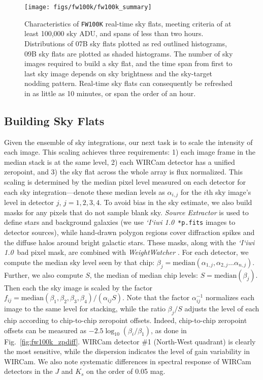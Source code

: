 \documentclass[iop]{emulateapj}
\newcommand{\sw}[1]{\textit{#1}} %
\newcommand{\iiwione}{\sw{`I`iwi 1.0}}
\newcommand{\Fig}[1]{Fig.~\ref{fig:#1}}  %
\begin{document}
\begin{figure}[t]
\centering
\texttt{[image: figs/fw100k/fw100k\_summary]}
\caption{Characteristics of \texttt{FW100K} real-time sky flats, meeting criteria of at least 100,000 sky ADU, and spans of less than two hours.
Distributions of 07B sky flats plotted as red outlined histograms, 09B sky flats are plotted as shaded histograms.
The number of sky images required to build a sky flat, and the time span from first to last sky image depends on sky brightness and the sky-target nodding pattern.
Real-time sky flats can consequently be refreshed in as little as 10 minutes, or span the order of an hour.}
\label{fig:fw100k_summary}
\end{figure}

\subsection{Building Sky Flats}
\label{sec:flatbuilding}

Given the ensemble of sky integrations, our next task is to scale the intensity of each image.
This scaling achieves three requirements: 1) each image frame in the median stack is at the same level, 2) each WIRCam detector has a unified zeropoint, and 3) the sky flat across the whole array is flux normalized.
This scaling is determined by the median pixel level measured on each detector for each sky integration---denote these median levels as $\alpha_{i,j}$ for the $i$th sky image's level in detector $j$, $j=1, 2, 3, 4$.
To avoid bias in the sky estimate, we also build masks for any pixels that do not sample blank sky.
\sw{Source Extractor} \citep{Bertin:1996} is used to define stars and background galaxies (we use \iiwione\ \texttt{*p.fits} images to detector sources), while hand-drawn polygon regions cover diffraction spikes and the diffuse halos around bright galactic stars. These masks, along with the \iiwione\ bad pixel mask, are combined with \sw{WeightWatcher} \citep{Marmo:2008}.
For each detector, we compute the median sky level seen by that chip: $\beta_j = \mathrm{median}(\alpha_{1,j}, \alpha_{2,j}\ldots \alpha_{n,j} )$.
Further, we also compute $S$, the median of median chip levels: $S=\mathrm{median}(\beta_j)$.
Then each the sky image is scaled by the factor $f_{ij} = \mathrm{median}(\beta_1, \beta_2, \beta_3, \beta_4) / (\alpha_{ij} S)$.
Note that the factor $\alpha_{ij}^{-1}$ normalizes each image to the same level for stacking, while the ratio $\beta_j / S$ adjusts the level of each chip according to chip-to-chip zeropoint offsets.
Indeed, chip-to-chip zeropoint offsets can be measured as $-2.5 \log_{10}(\beta_i / \beta_1)$, as done in \Fig{fw100k_zpdiff}.
WIRCam detector \#1 (North-West quadrant) is clearly the most sensitive, while the dispersion indicates the level of gain variability in WIRCam.
We also note systematic differences in spectral response of WIRCam detectors in the $J$ and $K_s$ on the order of 0.05 mag.
\end{document}
